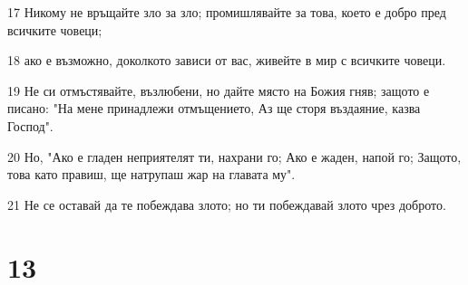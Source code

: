 \par 17 Никому не връщайте зло за зло; промишлявайте за това, което е добро пред всичките човеци;
\par 18 ако е възможно, доколкото зависи от вас, живейте в мир с всичките човеци.
\par 19 Не си отмъстявайте, възлюбени, но дайте място на Божия гняв; защото е писано: "На мене принадлежи отмъщението, Аз ще сторя въздаяние, казва Господ".
\par 20 Но, "Ако е гладен неприятелят ти, нахрани го; Ако е жаден, напой го; Защото, това като правиш, ще натрупаш жар на главата му".
\par 21 Не се оставай да те побеждава злото; но ти побеждавай злото чрез доброто.

\chapter{13}

